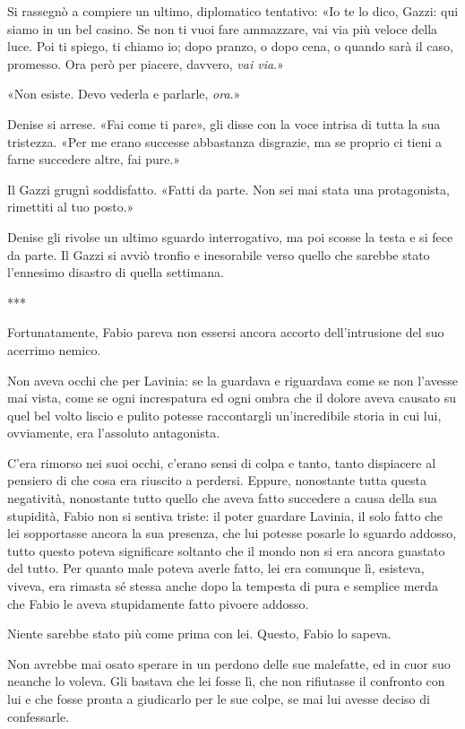 Si rassegnò a compiere un ultimo, diplomatico tentativo: «Io te lo dico, Gazzi: qui siamo in un bel casino. Se non ti vuoi fare ammazzare, vai via più veloce della luce. Poi ti spiego, ti chiamo io; dopo pranzo, o dopo cena, o quando sarà il caso, promesso. Ora però per piacere, davvero, \emph{vai via}.»

«Non esiste. Devo vederla e parlarle, \emph{ora}.»

Denise si arrese. «Fai come ti pare», gli disse con la voce intrisa di tutta la sua tristezza. «Per me erano successe abbastanza disgrazie, ma se proprio ci tieni a farne succedere altre, fai pure.»

Il Gazzi grugnì soddisfatto. «Fatti da parte. Non sei mai stata una protagonista, rimettiti al tuo posto.»

Denise gli rivolse un ultimo sguardo interrogativo, ma poi scosse la testa e si fece da parte. Il Gazzi si avviò tronfio e inesorabile verso quello che sarebbe stato l'ennesimo disastro di quella settimana.

\begin{center}
***
\end{center}

Fortunatamente, Fabio pareva non essersi ancora accorto dell'intrusione del suo acerrimo nemico.

Non aveva occhi che per Lavinia: se la guardava e riguardava come se non l'avesse mai vista, come se ogni increspatura ed ogni ombra che il dolore aveva causato su quel bel volto liscio e pulito potesse raccontargli un'incredibile storia in cui lui, ovviamente, era l'assoluto antagonista. 

C'era rimorso nei suoi occhi, c'erano sensi di colpa e tanto, tanto dispiacere al pensiero di che cosa era riuscito a perdersi. Eppure, nonostante tutta questa negatività, nonostante tutto quello che aveva fatto succedere a causa della sua stupidità, Fabio non si sentiva triste: il poter guardare Lavinia, il solo fatto che lei sopportasse ancora la sua presenza, che lui potesse posarle lo sguardo addosso, tutto questo poteva significare soltanto che il mondo non si era ancora guastato del tutto. Per quanto male poteva averle fatto, lei era comunque lì, esisteva, viveva, era rimasta sé stessa anche dopo la tempesta di pura e semplice merda che Fabio le aveva stupidamente fatto pivoere addosso.

Niente sarebbe stato più come prima con lei. Questo, Fabio lo sapeva.

Non avrebbe mai osato sperare in un perdono delle sue malefatte, ed in cuor suo neanche lo voleva. Gli bastava che lei fosse lì, che non rifiutasse il confronto con lui e che fosse pronta a giudicarlo per le sue colpe, se mai lui avesse deciso di confessarle.

